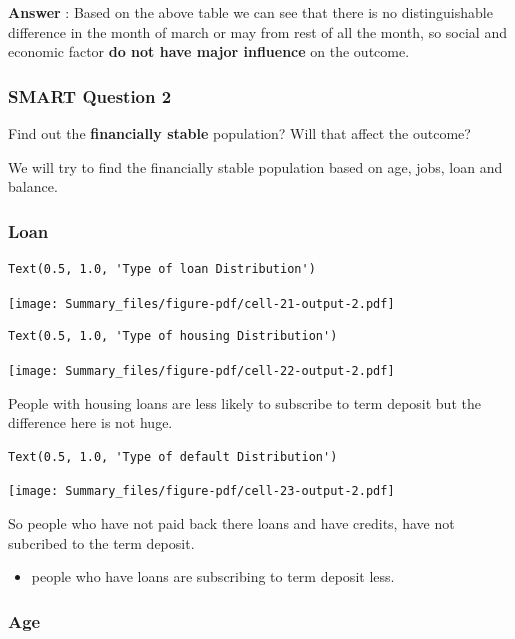 \documentclass[
  letterpaper,
  DIV=11,
  numbers=noendperiod]{scrartcl}
\providecommand{\tightlist}{%
  \setlength{\itemsep}{0pt}\setlength{\parskip}{0pt}}\usepackage{longtable,booktabs,array}
\begin{document}
\textbf{Answer} : Based on the above table we can see that there is no
distinguishable difference in the month of march or may from rest of all
the month, so social and economic factor \textbf{do not have major
influence} on the outcome.

\hypertarget{smart-question-2}{%
\subsubsection{SMART Question 2}\label{smart-question-2}}

Find out the \textbf{financially stable} population? Will that affect
the outcome?

We will try to find the financially stable population based on age,
jobs, loan and balance.

\hypertarget{loan}{%
\subsubsection{Loan}\label{loan}}

\begin{verbatim}
Text(0.5, 1.0, 'Type of loan Distribution')
\end{verbatim}

\texttt{[image: Summary\_files/figure-pdf/cell-21-output-2.pdf]}

\begin{verbatim}
Text(0.5, 1.0, 'Type of housing Distribution')
\end{verbatim}

\texttt{[image: Summary\_files/figure-pdf/cell-22-output-2.pdf]}

People with housing loans are less likely to subscribe to term deposit
but the difference here is not huge.

\begin{verbatim}
Text(0.5, 1.0, 'Type of default Distribution')
\end{verbatim}

\texttt{[image: Summary\_files/figure-pdf/cell-23-output-2.pdf]}

So people who have not paid back there loans and have credits, have not
subcribed to the term deposit.

\begin{itemize}
\tightlist
\item
  people who have loans are subscribing to term deposit less.
\end{itemize}

\hypertarget{age}{%
\subsubsection{Age}\label{age}}
\end{document}
